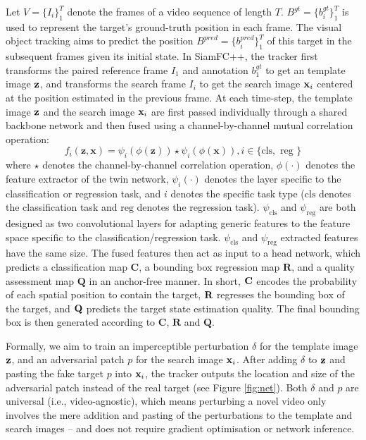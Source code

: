\documentclass[journal]{IEEEtran}
\newcommand{\ie}{i.e.}
\begin{document}
Let $V=\{I_i\}_1^T$ denote the frames of a video sequence of length $T$. $B^{gt}=\{b^{gt}_i\}_1^T$ is used to represent the target's ground-truth position in each frame. The visual object tracking aims to predict the position $B^{pred}=\{b^{pred}_i\}_1^T$ of this target in the subsequent frames given its initial state. In SiamFC++, the tracker first transforms the paired reference frame $I_1$ and annotation $b_1^{gt}$ to get an template image $\textbf z$, and transforms the search frame $I_i$ to get the search image $\textbf x_i$ centered at the position estimated in the previous frame. At each time-step, the template image $\textbf z$ and the search image $\textbf x_i$ are first passed individually through a shared backbone network and then fused using a channel-by-channel mutual correlation operation:
\begin{equation}
  f_{i}(\mathbf{z}, \mathbf{x})=\psi_{i}(\phi(\mathbf{z})) \star \psi_{i}(\phi(\mathbf{x})), i \in\{\mathrm{cls}, \text { reg }\}
\end{equation}
where $\star$ denotes the channel-by-channel correlation operation, $\phi(\cdot)$ denotes the feature extractor of the twin network, $\psi_i(\cdot)$ denotes the layer specific to the classification or regression task, and $i$ denotes the specific task type ($\mathrm{cls}$ denotes the classification task and $\mathrm{reg}$ denotes the regression task). $\psi_{\mathrm{cls}}$ and $\psi_{\mathrm{reg}}$ are both designed as two convolutional layers for adapting generic features to the feature space specific to the classification/regression task. $\psi_{\mathrm{cls}}$ and $\psi_{\mathrm{reg}}$ extracted features have the same size. The fused features then act as input to a head network, which predicts a classification map $\textbf{C}$, a bounding box regression map $\textbf{R}$, and a quality assessment map $\textbf{Q}$ in an anchor-free manner. In short, $\textbf C$ encodes the probability of each spatial position to contain the target, $\textbf R$ regresses the bounding box of the target, and $\textbf Q$ predicts the target state estimation quality. The final bounding box is then generated according to $\textbf{C}$, $\textbf{R}$ and $\textbf{Q}$.

Formally, we aim to train an imperceptible perturbation $\delta$ for the template image $\textbf z$, and an adversarial patch $p$ for the search image $\textbf x_i$. After adding $\delta$ to $\textbf z$ and pasting the fake target $p$ into $\textbf x_i$, the tracker outputs the location and size of the adversarial patch instead of the real target (see Figure \ref{fig:net}). Both $\delta$ and $p$ are universal (\ie, video-agnostic), which means perturbing a novel video only involves the mere addition and pasting of the perturbations to the template and search images -- and does not require gradient optimisation or network inference.
\end{document}
